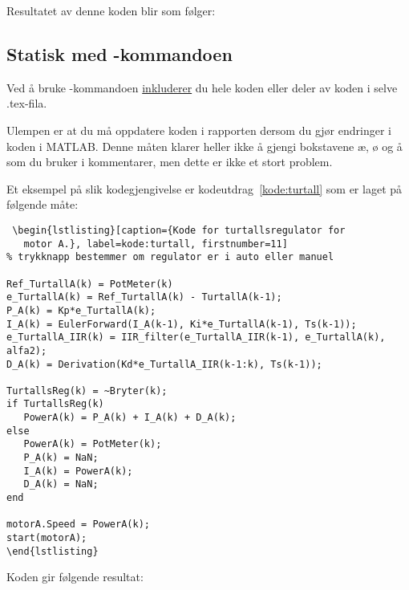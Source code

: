 Resultatet av denne koden blir som følger:

\label{side:Utdrag_av_SaveMyFigure}

\newpage
\subsection{Statisk med -kommandoen} 
Ved å bruke -kommandoen \underline{inkluderer} 
du hele koden eller deler av koden i selve .tex-fila. 

Ulempen er at du må 
oppdatere koden i rapporten dersom du gjør endringer i koden i
MATLAB. Denne måten klarer heller ikke å gjengi bokstavene
æ, ø og å som du bruker i kommentarer, men dette er ikke et stort problem. 


Et eksempel på slik kodegjengivelse er
kodeutdrag~\ref{kode:turtall} som er 
laget på følgende måte:

\begin{boxedminipage}{155mm}
\begin{verbatim}
 \begin{lstlisting}[caption={Kode for turtallsregulator for 
   motor A.}, label=kode:turtall, firstnumber=11]
% trykknapp bestemmer om regulator er i auto eller manuel

Ref_TurtallA(k) = PotMeter(k)
e_TurtallA(k) = Ref_TurtallA(k) - TurtallA(k-1);
P_A(k) = Kp*e_TurtallA(k);
I_A(k) = EulerForward(I_A(k-1), Ki*e_TurtallA(k-1), Ts(k-1));
e_TurtallA_IIR(k) = IIR_filter(e_TurtallA_IIR(k-1), e_TurtallA(k), alfa2);
D_A(k) = Derivation(Kd*e_TurtallA_IIR(k-1:k), Ts(k-1));

TurtallsReg(k) = ~Bryter(k);
if TurtallsReg(k)
   PowerA(k) = P_A(k) + I_A(k) + D_A(k);
else
   PowerA(k) = PotMeter(k);
   P_A(k) = NaN;
   I_A(k) = PowerA(k);
   D_A(k) = NaN;
end

motorA.Speed = PowerA(k);
start(motorA);   
\end{lstlisting}
\end{verbatim}
\end{boxedminipage}

\newpage

Koden gir følgende resultat:

